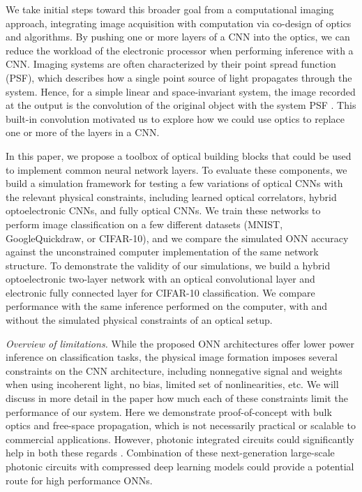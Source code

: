 We take initial steps toward this broader goal from a computational imaging approach, integrating image acquisition with computation via co-design of optics and algorithms. By pushing one or more layers of a CNN into the optics, we can reduce the workload of the electronic processor when performing inference with a CNN. Imaging systems are often characterized by their point spread function (PSF), which describes how a single point source of light propagates through the system. Hence, for a simple linear and space-invariant system, the image recorded at the output is the convolution of the original object with the system PSF \cite{goodman2008introduction}. This built-in convolution motivated us to explore how we could use optics to replace one or more of the layers in a CNN. 

In this paper, we propose a toolbox of optical building blocks that could be used to implement common neural network layers. To evaluate these components, we build a simulation framework for testing a few variations of optical CNNs with the relevant physical constraints, including learned optical correlators, hybrid optoelectronic CNNs, and fully optical CNNs. We train these networks to perform image classification on a few different datasets (MNIST, GoogleQuickdraw, or CIFAR-10), and we compare the simulated ONN accuracy against the unconstrained computer implementation of the same network structure. To demonstrate the validity of our simulations, we build a hybrid optoelectronic two-layer network with an optical convolutional layer and electronic fully connected layer for CIFAR-10 classification. We compare performance with the same inference performed on the computer, with and without the simulated physical constraints of an optical setup. 

\textit{Overview of limitations.} 
While the proposed ONN architectures offer lower power inference on classification tasks, the physical image formation imposes several constraints on the CNN architecture, including nonnegative signal and weights when using incoherent light, no bias, limited set of nonlinearities, etc. We will discuss in more detail in the paper how much each of these constraints limit the performance of our system. Here we demonstrate proof-of-concept with bulk optics and free-space propagation, which is not necessarily practical or scalable to commercial applications. However, photonic integrated circuits could significantly help in both these regards \cite{sun2013large,rechtsman2013photonic,shen2017deep}. Combination of these next-generation large-scale photonic circuits with compressed deep learning models could provide a potential route for high performance ONNs.

